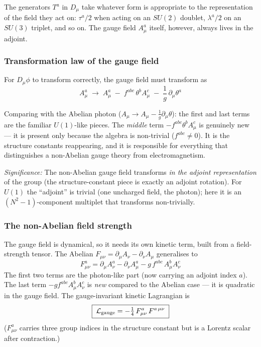 \documentclass[../main.tex]{subfiles}
\begin{document}
\begin{note}
The generators $T^a$ in $D_\mu$ take whatever form is appropriate to the representation of the field they act on: $\tau^a/2$ when acting on an $SU(2)$ doublet, $\lambda^a/2$ on an $SU(3)$ triplet, and so on. The gauge field $A_\mu^a$ itself, however, always lives in the adjoint.
\end{note}

\subsubsection*{Transformation law of the gauge field}

For $D_\mu\phi$ to transform correctly, the gauge field must transform as
\begin{equation}
  \boxed{\;A_\mu^a \;\to\; A_\mu^a \;-\; f^{abc}\,\theta^b A_\mu^c \;-\; \frac{1}{g}\,\partial_\mu\theta^a\;}
  \label{eq:lec13:gaugetransf}
\end{equation}

Comparing with the Abelian photon ($A_\mu\to A_\mu-\tfrac1g\partial_\mu\theta$): the first and last terms are the familiar $U(1)$-like pieces. The \emph{middle} term $-f^{abc}\theta^b A_\mu^c$ is genuinely new --- it is present only because the algebra is non-trivial ($f^{abc}\neq0$). It is the structure constants reappearing, and it is responsible for everything that distinguishes a non-Abelian gauge theory from electromagnetism.

\textit{Significance:} The non-Abelian gauge field transforms \emph{in the adjoint representation} of the group (the structure-constant piece is exactly an adjoint rotation). For $U(1)$ the ``adjoint'' is trivial (one uncharged field, the photon); here it is an $(N^2-1)$-component multiplet that transforms non-trivially.

\subsubsection*{The non-Abelian field strength}

The gauge field is dynamical, so it needs its own kinetic term, built from a field-strength tensor. The Abelian $F_{\mu\nu}=\partial_\mu A_\nu-\partial_\nu A_\mu$ generalises to
\begin{equation}
  \boxed{\;F_{\mu\nu}^a = \partial_\mu A_\nu^a - \partial_\nu A_\mu^a - g\,f^{abc}\,A_\mu^b A_\nu^c\;}
  \label{eq:lec13:fieldstrength}
\end{equation}
The first two terms are the photon-like part (now carrying an adjoint index $a$). The last term $-g f^{abc}A_\mu^b A_\nu^c$ is \emph{new} compared to the Abelian case --- it is quadratic in the gauge field. The gauge-invariant kinetic Lagrangian is
\begin{equation}
  \boxed{\;\mathcal{L}_{\rm gauge} = -\tfrac14\,F_{\mu\nu}^a\,F^{a\,\mu\nu}\;}
  \label{eq:lec13:gaugekinetic}
\end{equation}
($F_{\mu\nu}^a$ carries three group indices in the structure constant but is a Lorentz scalar after contraction.)
\end{document}
